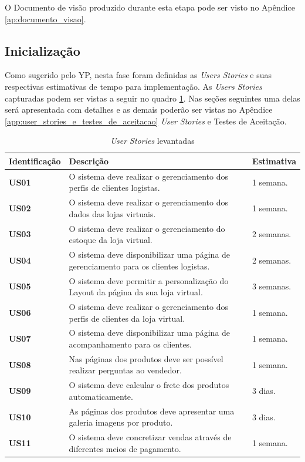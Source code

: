 \documentclass[a4paper,12pt]{monografia}
\begin{document}
O Documento de visão produzido durante esta etapa pode ser visto no Apêndice \ref{ap:documento_visao}.


\subsection{Inicialização} %
\label{sub:inicializacao}
Como sugerido pelo YP, nesta fase foram definidas as \textit{Users Stories} e suas respectivas estimativas de tempo para implementação.  As \textit{Users Stories} capturadas podem ser vistas a seguir no quadro \ref{quadro:userstories}. Nas seções seguintes uma delas será apresentada com detalhes e as demais poderão ser vistas no Apêndice \ref{app:user_stories_e_testes_de_aceitacao} \textit{\textit{User Stories}} e Testes de Aceitação.	

\begin{longtable}{|p{3cm}|p{9cm}|p{3cm}|}
\caption{\textit{\textit{User Stories}} levantadas}
\label{quadro:userstories}
\hline
\rowcolor{ballblue}
\textbf{Identificação} & \textbf{Descrição} & \textbf{Estimativa}\\
\hline
\textbf{US01} & O sistema deve realizar o gerenciamento dos perfis de clientes logistas. & 1 semana.\\
\hline
\textbf{US02} & O sistema deve realizar o gerenciamento dos dados das lojas virtuais. & 1 semana.\\
\hline
\textbf{US03} & O sistema deve realizar o gerenciamento do estoque da loja virtual. & 2 semanas.\\
\hline
\textbf{US04} & O sistema deve disponibilizar uma página de gerenciamento para os clientes logistas. & 2 semanas.\\
\hline
\textbf{US05} & O sistema deve permitir a personalização do Layout da página da sua loja virtual. & 3 semanas.\\
\hline
\textbf{US06} & O sistema deve realizar o gerenciamento dos perfis de clientes da loja virtual. & 1 semana.\\
\hline
\textbf{US07} & O sistema deve disponibilizar uma página de acompanhamento para os clientes. & 1 semana.\\
\hline
\textbf{US08} & Nas páginas dos produtos deve ser possível realizar perguntas ao vendedor. & 1 semana.\\
\hline
\textbf{US09} & O sistema deve calcular o frete dos produtos automaticamente. & 3 dias.\\
\hline
\textbf{US10} & As páginas dos produtos deve apresentar uma galeria imagens por produto. & 3 dias.\\
\hline
\textbf{US11} & O sistema deve concretizar vendas através de diferentes meios de pagamento. & 1 semana.\\
\hline
\end{longtable}	
\end{document}
